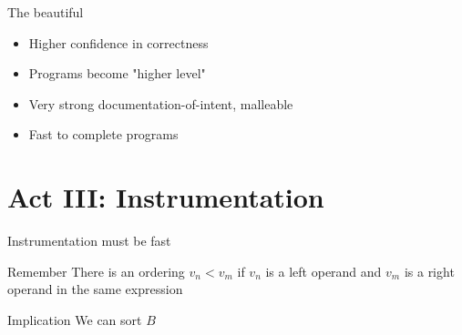 \documentclass[xcolor = {dvipsnames, table}]{beamer}
\begin{document}
\begin{frame}
    \begin{block}{The beautiful}
        \begin{itemize}
            \item Higher confidence in correctness
            \item Programs become "higher level"
            \item Very strong documentation-of-intent, malleable
            \item Fast to complete programs
        \end{itemize}
    \end{block}
\end{frame}

\section{Act III: Instrumentation}

\begin{frame}
    Instrumentation must be fast
\end{frame}

\begin{frame}
    \begin{block}{Remember}
        There is an ordering $v_n < v_m$ if $v_n$ is a left operand and $v_m$ is
        a right operand in the same expression
    \end{block}

    \begin{block}{Implication}
        We can sort $B$
    \end{block}
\end{frame}
\end{document}

